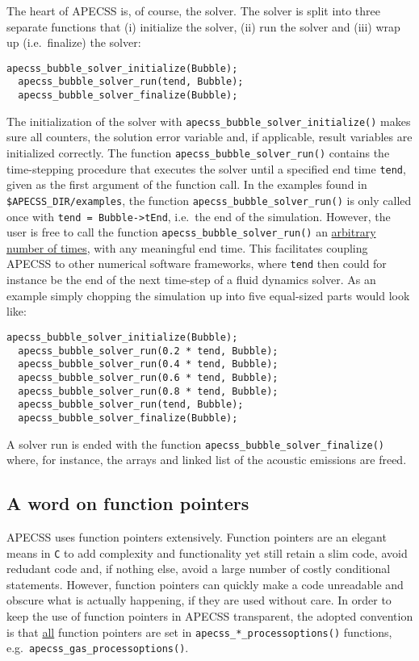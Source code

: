 The heart of APECSS is, of course, the solver. The solver is split into three separate functions that (i) initialize the solver, (ii) run the solver and (iii) wrap up (i.e.~finalize) the solver:
\begin{lstlisting}[style=CStyle]
  apecss_bubble_solver_initialize(Bubble);
  apecss_bubble_solver_run(tend, Bubble);
  apecss_bubble_solver_finalize(Bubble);
\end{lstlisting}\vspace{-0.75em}
The initialization of the solver with {\tt apecss\_bubble\_solver\_initialize()} makes sure all counters, the solution error variable and, if applicable, result variables are initialized correctly. The function {\tt apecss\_bubble\_solver\_run()} contains the time-stepping procedure that executes the solver until a specified end time {\tt tend}, given as the first argument of the function call. In the examples found in {\tt \$APECSS\_DIR/examples}, the function {\tt apecss\_bubble\_solver\_run()} is only called once with {\tt tend = Bubble->tEnd}, i.e.~the end of the simulation. However, the user is free to call the function {\tt apecss\_bubble\_solver\_run()} an \underline{arbitrary number of times}, with any meaningful end time. This facilitates coupling APECSS to other numerical software frameworks, where {\tt tend} then could for instance be the end of the next time-step of a fluid dynamics solver. As an example simply chopping the simulation up into five equal-sized parts would look like:
\begin{lstlisting}[style=CStyle]
  apecss_bubble_solver_initialize(Bubble);
  apecss_bubble_solver_run(0.2 * tend, Bubble);
  apecss_bubble_solver_run(0.4 * tend, Bubble);
  apecss_bubble_solver_run(0.6 * tend, Bubble);
  apecss_bubble_solver_run(0.8 * tend, Bubble);
  apecss_bubble_solver_run(tend, Bubble);
  apecss_bubble_solver_finalize(Bubble);
\end{lstlisting}\vspace{-0.75em}
A solver run is ended with the function {\tt apecss\_bubble\_solver\_finalize()} where, for instance, the arrays and linked list of the acoustic emissions are freed.

\subsection{A word on function pointers}

APECSS uses function pointers extensively. Function pointers are an elegant means in {\tt C} to add complexity and functionality yet still retain a slim code, avoid redudant code and, if nothing else, avoid a large number of costly conditional statements. However, function pointers can quickly make a code unreadable and obscure what is actually happening, if they are used without care. In order to keep the use of function pointers in APECSS transparent, the adopted convention is that \underline{all} function pointers are set in {\tt apecss\_*\_processoptions()} functions, e.g.~{\tt apecss\_gas\_processoptions()}.

